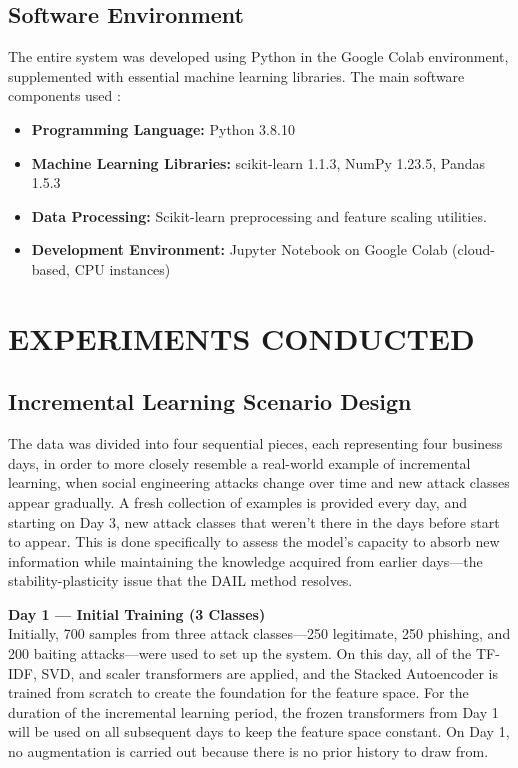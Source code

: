 \subsection{Software Environment}
The entire system was developed using Python in the Google Colab
environment, supplemented with essential machine learning libraries. The main software components used :
\begin{itemize}
    \item \textbf{Programming Language:} Python 3.8.10

    \item \textbf{Machine Learning Libraries:} scikit-learn 1.1.3, NumPy 1.23.5, Pandas 1.5.3
    \item \textbf{Data Processing:} Scikit-learn preprocessing and feature scaling utilities.
    \item \textbf{Development Environment:} Jupyter Notebook on Google Colab (cloud-based, CPU instances)
\end{itemize}

\section{EXPERIMENTS CONDUCTED}
\subsection{Incremental Learning Scenario Design}
The data was divided into four sequential pieces, each representing four business days, in order to more closely resemble a real-world example of incremental learning, when social engineering attacks change over time and new attack classes appear gradually. A fresh collection of examples is provided every day, and starting on Day 3, new attack classes that weren't there in the days before start to appear. This is done specifically to assess the model's capacity to absorb new information while maintaining the knowledge acquired from earlier days—the stability-plasticity issue that the DAIL method resolves.

\textbf{Day 1 — Initial Training (3 Classes)}\\
Initially, 700 samples from three attack classes—250 legitimate, 250 phishing, and 200 baiting attacks—were used to set up the system. On this day, all of the TF-IDF, SVD, and scaler transformers are applied, and the Stacked Autoencoder is trained from scratch to create the foundation for the feature space. For the duration of the incremental learning period, the frozen transformers from Day 1 will be used on all subsequent days to keep the feature space constant. On Day 1, no augmentation is carried out because there is no prior history to draw from.

